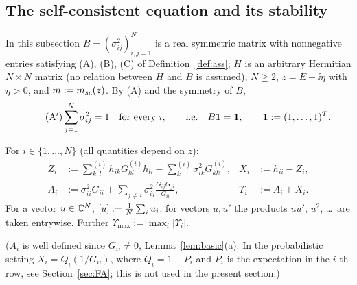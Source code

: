 \subsection{The self-consistent equation and its stability}\label{sec:stab}
In this subsection $B=(\sigma_{ij}^2)_{i,j=1}^N$ is a real symmetric matrix with nonnegative entries satisfying (A), (B), (C) of Definition~\ref{def:ass}; $H$ is an arbitrary Hermitian $N\times N$ matrix
(no relation between $H$ and $B$ is assumed), $N\ge2$, $z=E+\ii\eta$ with $\eta>0$, and $m:=m_{sc}(z)$. By (A) and the symmetry of $B$,
\begin{equation}\tag{A$'$}\label{eq:Arow}
 \sum_{j=1}^N\sigma_{ij}^2=1\quad\text{for every }i,\qquad\text{i.e.}\quad B\mathbf{1}=\mathbf{1},\qquad\mathbf{1}:=(1,\dots,1)^{T}.
\end{equation}
\begin{definition}\label{def:XA}
For $i\in\{1,\dots,N\}$ (all quantities depend on $z$):
\begin{align*}
 Z_i&:=\sum^{(i)}_{k,l}h_{ik}G^{(i)}_{kl}h_{li}-\sum^{(i)}_k\sigma_{ik}^2G^{(i)}_{kk}, & X_i&:=h_{ii}-Z_i,\\
 A_i&:=\sigma_{ii}^2G_{ii}+\sum_{j\ne i}\sigma_{ij}^2\frac{G_{ij}G_{ji}}{G_{ii}}, & \Upsilon_i&:=A_i+X_i .
\end{align*}
For a vector $u\in\mathbb{C}^N$, $[u]:=\frac1N\sum_iu_i$; for vectors $u,u'$ the products $uu'$, $u^2$, \dots\ are taken entrywise. Further $\Upsilon_{\max}:=\max_i|\Upsilon_i|$.
\end{definition}
\noindent($A_i$ is well defined since $G_{ii}\ne0$, Lemma~\ref{lem:basic}(a). In the probabilistic setting $X_i=Q_i(1/G_{ii})$, where $Q_i=1-P_i$ and $P_i$ is the expectation in the $i$-th row, see Section~\ref{sec:FA}; this is not used in the present section.)

